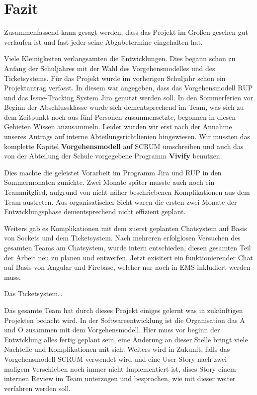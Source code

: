 \chapter{Fazit}

Zusammenfassend kann gesagt werden, dass das Projekt im Großen gesehen gut verlaufen ist und fast jeder seine Abgabetermine eingehalten hat.

Viele Kleinigkeiten verlangsamten die Entwicklungen. Dies begann schon zu Anfang der Schuljahres mit der Wahl des Vorgehensmodelles und des Ticketsystems.
Für das Projekt wurde im vorherigen Schuljahr schon ein Projektantrag verfasst. In diesem war angegeben, dass das Vorgehensmodell RUP und das Issue-Tracking
System Jira genutzt werden soll. In den Sommerferien vor Beginn der Abschlussklasse wurde sich dementsprechend im Team, was sich zu dem Zeitpunkt noch
aus fünf Personen zusammensetzte, begonnen in diesen Gebieten Wissen anzusammeln. Leider wurden wir erst nach der Annahme unseres Antrags auf interne Abteilungsrichtlienien
hingewiesen. Wir mussten das komplette Kapitel \textbf{Vorgehensmodell} auf SCRUM umschreiben und auch das von der Abteilung der Schule vorgegebene Programm \textbf{Vivify} benutzen.

Dies machte die geleistet Vorarbeit im Programm Jira und RUP in den Sommermonaten zunichte. Zwei Monate später musste auch noch ein Teammitglied, aufgrund von nicht näher beschriebenen
Komplikationen aus dem Team austreten. Aus organisatischer Sicht waren die ersten zwei Monate der Entwicklungsphase dementsprechend nicht effizient geplant.

Weiters gab es Komplikationen mit dem zuerst geplanten Chatsystem auf Basis von Sockets und dem Ticketsystem. Nach mehreren erfolglosen Versuchen des gesamten Teams am Chatsystem,
wurde intern entschieden, diesen gesamten Teil der Arbeit neu zu planen und entwerfen. Jetzt exisitert ein funktionierender Chat auf Basis von Angular und Firebase, welcher nur noch
in EMS inkludiert werden muss.

Das Ticketsystem\dots

Das gesamte Team hat durch dieses Projekt einiges gelernt was in zukünftigen Projekten bedacht wird.
In der Softwareentwicklung ist die Organisation das A und O zusammen mit dem Vorgehensmodell. Hier muss vor beginn der Entwicklung alles fertig geplant sein,
eine Änderung an dieser Stelle bringt viele Nachteile und Komplikationen mit sich.
Weiters wird in Zukunft, falls das Vorgehensmodell SCRUM verwendet wird und eine User-Story nach zwei maligem Verschieben noch immer nicht Implementiert ist,
dises Story einem internen Review im Team unterzogen und besprochen, wie mit dieser weiter verfahren werden soll.

